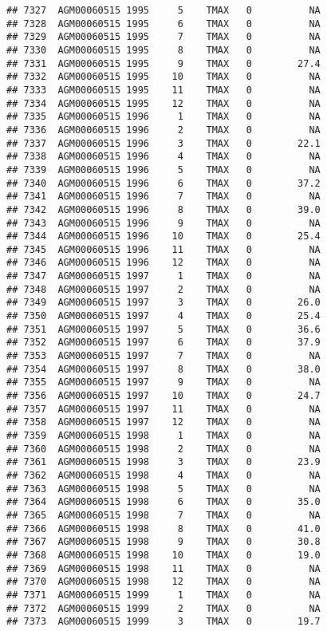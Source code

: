 \documentclass{article}\usepackage[]{graphicx}\usepackage[]{color}
\makeatletter
\newenvironment{kframe}{%
 \def\at@end@of@kframe{}%
 \ifinner\ifhmode%
  \def\at@end@of@kframe{\end{minipage}}%
  \begin{minipage}{\columnwidth}%
 \fi\fi%
 \def\FrameCommand##1{\hskip\@totalleftmargin \hskip-\fboxsep
 \colorbox{shadecolor}{##1}\hskip-\fboxsep
     \hskip-\linewidth \hskip-\@totalleftmargin \hskip\columnwidth}%
 \MakeFramed {\advance\hsize-\width
   \@totalleftmargin\z@ \linewidth\hsize
   \@setminipage}}%
 {\par\unskip\endMakeFramed%
 \at@end@of@kframe}
\newenvironment{knitrout}{}{} %
\makeatother
\begin{document}
\begin{knitrout}
\begin{kframe}
\begin{verbatim}
## 7327  AGM00060515 1995     5    TMAX   0          NA
## 7328  AGM00060515 1995     6    TMAX   0          NA
## 7329  AGM00060515 1995     7    TMAX   0          NA
## 7330  AGM00060515 1995     8    TMAX   0          NA
## 7331  AGM00060515 1995     9    TMAX   0        27.4
## 7332  AGM00060515 1995    10    TMAX   0          NA
## 7333  AGM00060515 1995    11    TMAX   0          NA
## 7334  AGM00060515 1995    12    TMAX   0          NA
## 7335  AGM00060515 1996     1    TMAX   0          NA
## 7336  AGM00060515 1996     2    TMAX   0          NA
## 7337  AGM00060515 1996     3    TMAX   0        22.1
## 7338  AGM00060515 1996     4    TMAX   0          NA
## 7339  AGM00060515 1996     5    TMAX   0          NA
## 7340  AGM00060515 1996     6    TMAX   0        37.2
## 7341  AGM00060515 1996     7    TMAX   0          NA
## 7342  AGM00060515 1996     8    TMAX   0        39.0
## 7343  AGM00060515 1996     9    TMAX   0          NA
## 7344  AGM00060515 1996    10    TMAX   0        25.4
## 7345  AGM00060515 1996    11    TMAX   0          NA
## 7346  AGM00060515 1996    12    TMAX   0          NA
## 7347  AGM00060515 1997     1    TMAX   0          NA
## 7348  AGM00060515 1997     2    TMAX   0          NA
## 7349  AGM00060515 1997     3    TMAX   0        26.0
## 7350  AGM00060515 1997     4    TMAX   0        25.4
## 7351  AGM00060515 1997     5    TMAX   0        36.6
## 7352  AGM00060515 1997     6    TMAX   0        37.9
## 7353  AGM00060515 1997     7    TMAX   0          NA
## 7354  AGM00060515 1997     8    TMAX   0        38.0
## 7355  AGM00060515 1997     9    TMAX   0          NA
## 7356  AGM00060515 1997    10    TMAX   0        24.7
## 7357  AGM00060515 1997    11    TMAX   0          NA
## 7358  AGM00060515 1997    12    TMAX   0          NA
## 7359  AGM00060515 1998     1    TMAX   0          NA
## 7360  AGM00060515 1998     2    TMAX   0          NA
## 7361  AGM00060515 1998     3    TMAX   0        23.9
## 7362  AGM00060515 1998     4    TMAX   0          NA
## 7363  AGM00060515 1998     5    TMAX   0          NA
## 7364  AGM00060515 1998     6    TMAX   0        35.0
## 7365  AGM00060515 1998     7    TMAX   0          NA
## 7366  AGM00060515 1998     8    TMAX   0        41.0
## 7367  AGM00060515 1998     9    TMAX   0        30.8
## 7368  AGM00060515 1998    10    TMAX   0        19.0
## 7369  AGM00060515 1998    11    TMAX   0          NA
## 7370  AGM00060515 1998    12    TMAX   0          NA
## 7371  AGM00060515 1999     1    TMAX   0          NA
## 7372  AGM00060515 1999     2    TMAX   0          NA
## 7373  AGM00060515 1999     3    TMAX   0        19.7

\end{verbatim}
\end{kframe}
\end{knitrout}
\end{document}
